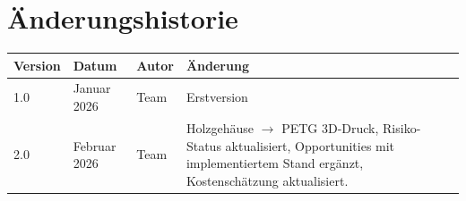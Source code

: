 \documentclass[a4paper,11pt]{article}
\begin{document}
\section{Änderungshistorie}

\begin{tabularx}{\textwidth}{l l l X}
\toprule
\rowcolor{tableheader}
\textbf{Version} & \textbf{Datum} & \textbf{Autor} & \textbf{Änderung} \\
\midrule
1.0 & Januar 2026 & Team & Erstversion \\
2.0 & Februar 2026 & Team & Holzgehäuse $\to$ PETG 3D-Druck, Risiko-Status aktualisiert, Opportunities mit implementiertem Stand ergänzt, Kostenschätzung aktualisiert. \\
\bottomrule
\end{tabularx}
\end{document}
